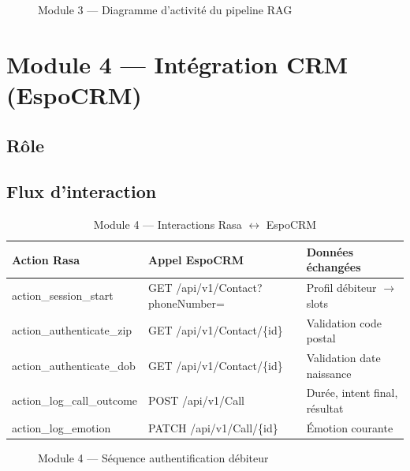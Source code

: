 \begin{figure}[H]
  \centering
  
  \caption{Module 3 — Diagramme d'activité du pipeline RAG}
  \label{fig:m3_activity_rag}
\end{figure}

\section{Module 4 — Intégration CRM (EspoCRM)}

\subsection{Rôle}


\subsection{Flux d'interaction}

\begin{table}[H]
  \centering
  \caption{Module 4 — Interactions Rasa $\leftrightarrow$ EspoCRM}
  \label{tab:crm_interactions}
  \begin{tabularx}{\textwidth}{lXX}
    \toprule
    \textbf{Action Rasa} & \textbf{Appel EspoCRM} & \textbf{Données échangées} \\
    \midrule
    action\_session\_start     & GET /api/v1/Contact?phoneNumber= & Profil débiteur $\rightarrow$ slots \\
    action\_authenticate\_zip  & GET /api/v1/Contact/\{id\}        & Validation code postal \\
    action\_authenticate\_dob  & GET /api/v1/Contact/\{id\}        & Validation date naissance \\
    action\_log\_call\_outcome & POST /api/v1/Call                 & Durée, intent final, résultat \\
    action\_log\_emotion       & PATCH /api/v1/Call/\{id\}         & Émotion courante \\
    \bottomrule
  \end{tabularx}
\end{table}

\begin{figure}[H]
  \centering
  
  \caption{Module 4 — Séquence authentification débiteur}
  \label{fig:m4_seq_auth}
\end{figure}

